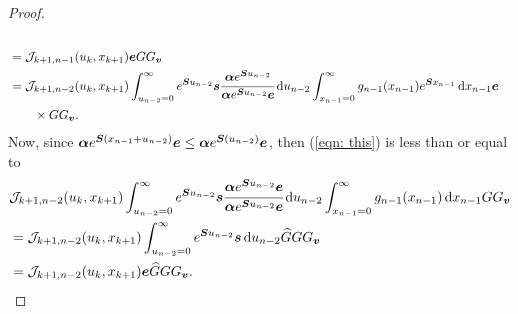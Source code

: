 \begin{proof}
\begin{align}
		\\& = \mathcal J_{k+1,n-1}(u_k,x_{k+1})  \boldsymbol e G  G_{\boldsymbol v}\label{eqn: mid ref} 
		\\& = \mathcal J_{k+1,n-2}(u_k,x_{k+1}) \int_{u_{n-2}=0}^\infty e^{\boldsymbol{S}u_{n-2}}\boldsymbol s \cfrac{\boldsymbol \alpha e^{\boldsymbol{S}u_{n-2}}}{\boldsymbol \alpha e^{\boldsymbol{S}u_{n-2}}\boldsymbol e}\, \mathrm{d} u_{n-2}  \int_{x_{n-1}=0}^\infty g_{n-1}(x_{n-1}) e^{\boldsymbol{S}x_{n-1}} \, \mathrm{d} x_{n-1} \boldsymbol e \nonumber 
		\\&\qquad {} \times G  G_{\boldsymbol v}.\label{eqn: this}
	\end{align}
	Now, since \(\boldsymbol\alpha e^{\boldsymbol{S}(x_{n-1}+u_{n-2})}\boldsymbol e\leq  \boldsymbol\alpha e^{\boldsymbol{S}(u_{n-2})}\boldsymbol e\), then (\ref{eqn: this}) is less than or equal to
	\begin{align}
		&\mathcal J_{k+1,n-2}(u_k,x_{k+1}) \int_{u_{n-2}=0}^\infty e^{\bs{S}u_{n-2}}\bs s \cfrac{\bs \alpha e^{\bs{S}u_{n-2}}\bs e}{\bs \alpha e^{\bs{S}u_{n-2}}\bs e}\wrt u_{n-2}  \int_{x_{n-1}=0}^\infty g_{n-1}(x_{n-1})\wrt x_{n-1} G  G_{\bs v}\nonumber
		\\& = \mathcal J_{k+1,n-2}(u_k,x_{k+1}) \int_{u_{n-2}=0}^\infty e^{\bs{S}u_{n-2}}\bs s \wrt u_{n-2} \widehat G G G_{\bs v} \nonumber
		\\& = \mathcal J_{k+1,n-2}(u_k,x_{k+1}) \bs e \widehat G G G_{\bs v}. \label{eqn: ref here too}

\end{align}
\end{proof}
